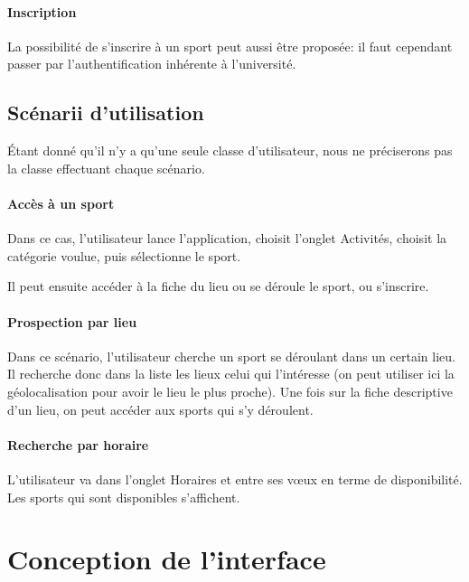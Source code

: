 \documentclass{article}
\begin{document}
        \paragraph{Inscription}

            La possibilité de s'inscrire à un sport peut aussi être proposée: il
            faut cependant passer par l'authentification inhérente à
            l'université.


    \subsection{Scénarii d'utilisation}

    Étant donné qu'il n'y a qu'une seule classe d'utilisateur, nous ne
    préciserons pas la classe effectuant chaque scénario.

        \paragraph{Accès à un sport}

            Dans ce cas, l'utilisateur lance l'application, choisit l'onglet
            Activités, choisit la catégorie voulue, puis sélectionne le sport.

            Il peut ensuite accéder à la fiche du lieu ou se déroule le sport, ou s'inscrire.

        \paragraph{Prospection par lieu}

            Dans ce scénario, l'utilisateur cherche un sport se déroulant dans un
            certain lieu. Il recherche donc dans la liste les lieux celui qui
            l'intéresse (on peut utiliser ici la géolocalisation pour avoir le
            lieu le plus proche). Une fois sur la fiche descriptive d'un lieu,
            on peut accéder aux sports qui s'y déroulent.

        \paragraph{Recherche par horaire}

            L'utilisateur va dans l'onglet \og Horaires\fg{} et entre ses vœux
            en terme de disponibilité. Les sports qui sont disponibles s'affichent.
	
\section{Conception de l'interface}
\end{document}
